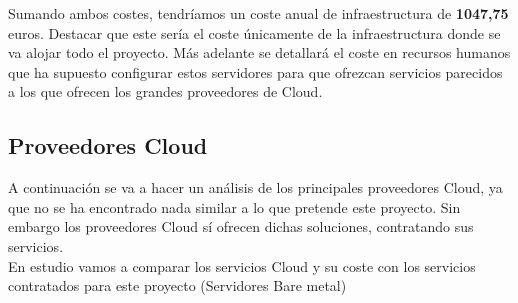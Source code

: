 \begin{text}
		Sumando ambos costes, tendríamos un coste anual de infraestructura de \textbf{1047,75} euros. Destacar que este sería el coste únicamente de la infraestructura donde se va alojar todo el proyecto. Más adelante se detallará el coste en recursos humanos que ha supuesto configurar estos servidores para que ofrezcan servicios parecidos a los que ofrecen los grandes proveedores de Cloud.
		
	\end{text}
	\subsection{Proveedores Cloud}
		\begin{text}
			A continuación se va a hacer un análisis de los principales proveedores Cloud, ya que no se ha encontrado nada similar a lo que pretende este proyecto. Sin embargo los proveedores Cloud sí ofrecen dichas soluciones, contratando sus servicios. \\
			En estudio vamos a comparar los servicios Cloud y su coste con los servicios contratados para este proyecto (Servidores Bare metal) \\
		\end{text}
		
